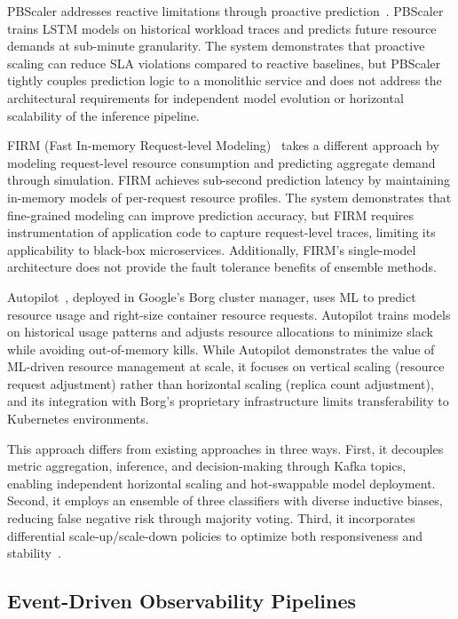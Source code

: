 \documentclass[conference]{IEEEtran}
\begin{document}
PBScaler addresses reactive limitations through proactive prediction~\cite{pbscaler}. PBScaler trains LSTM models on historical workload traces and predicts future resource demands at sub-minute granularity. The system demonstrates that proactive scaling can reduce SLA violations compared to reactive baselines, but PBScaler tightly couples prediction logic to a monolithic service and does not address the architectural requirements for independent model evolution or horizontal scalability of the inference pipeline.


FIRM (Fast In-memory Request-level Modeling)~\cite{firm} takes a different approach by modeling request-level resource consumption and predicting aggregate demand through simulation. FIRM achieves sub-second prediction latency by maintaining in-memory models of per-request resource profiles. The system demonstrates that fine-grained modeling can improve prediction accuracy, but FIRM requires instrumentation of application code to capture request-level traces, limiting its applicability to black-box microservices. Additionally, FIRM's single-model architecture does not provide the fault tolerance benefits of ensemble methods.

Autopilot~\cite{autopilot}, deployed in Google's Borg cluster manager, uses ML to predict resource usage and right-size container resource requests. Autopilot trains models on historical usage patterns and adjusts resource allocations to minimize slack while avoiding out-of-memory kills. While Autopilot demonstrates the value of ML-driven resource management at scale, it focuses on vertical scaling (resource request adjustment) rather than horizontal scaling (replica count adjustment), and its integration with Borg's proprietary infrastructure limits transferability to Kubernetes environments.

This approach differs from existing approaches in three ways. First, it decouples metric aggregation, inference, and decision-making through Kafka topics, enabling independent horizontal scaling and hot-swappable model deployment. Second, it employs an ensemble of three classifiers with diverse inductive biases, reducing false negative risk through majority voting. Third, it incorporates differential scale-up/scale-down policies to optimize both responsiveness and stability~\cite{lorido2014autoscaling,autopilot}.

\subsection{Event-Driven Observability Pipelines}
\end{document}
